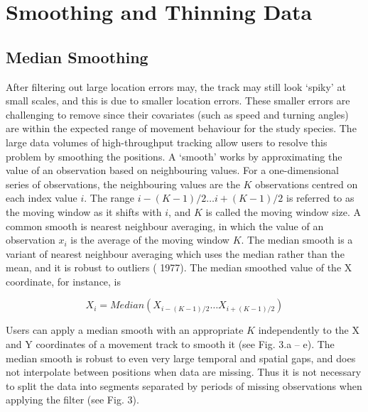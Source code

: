 \documentclass[10pt,paper=a4,headings=standardclasses
]{scrartcl}
\begin{document}
\section{Smoothing and Thinning Data}

\subsection{Median Smoothing}

After filtering out large location errors may, the track may still look ‘spiky’ at small scales, and this is due to smaller location errors.
These smaller errors are challenging to remove since their covariates (such as speed and turning angles) are within the expected range of movement behaviour for the study species. 
The large data volumes of high-throughput tracking allow users to resolve this problem by smoothing the positions. 
A ‘smooth’ works by approximating the value of an observation based on neighbouring values.
For a one-dimensional series of observations, the neighbouring values are the $K$ observations centred on each index value $i$.
The range $ {i - (K-1)/2} \ldots {i + (K-1)/2} $ is referred to as the moving window as it shifts with $i$, and $K$ is called the moving window size.
A common smooth is nearest neighbour averaging, in which the value of an observation $x_i$ is the average of the moving window $K$.
The median smooth is a variant of nearest neighbour averaging which uses the median rather than the mean, and it is robust to outliers (\citeauthor{tukey1977} 1977).
The median smoothed value of the X coordinate, for instance, is
\begin{linenomath*}
    \begin{equation*}
        X_i = Median(X_{i - (K-1)/2} \ldots X_{i + (K-1)/2})
     \end{equation*}
\end{linenomath*}
Users can apply a median smooth with an appropriate $K$ independently to the X and Y coordinates of a movement track to smooth it (see Fig. 3.a -- e). 
The median smooth is robust to even very large temporal and spatial gaps, and does not interpolate between positions when data are missing. 
Thus it is not necessary to split the data into segments separated by periods of missing observations when applying the filter (see Fig. 3).
\end{document}
